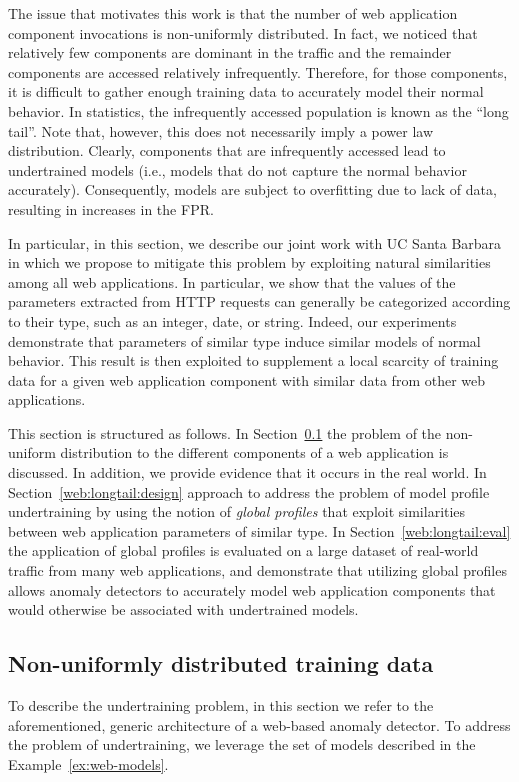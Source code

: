 The issue that motivates this work is that the number of web application component invocations is non-uniformly distributed. In fact, we noticed that relatively few components are dominant in the traffic and the remainder components are accessed relatively infrequently. Therefore, for those components, it is difficult to gather enough training data to accurately model their normal behavior.  In statistics, the infrequently accessed population is known as the ``long tail''. Note that, however, this does not necessarily imply a power law distribution. Clearly, components that are infrequently accessed lead to undertrained models (i.e., models that do not capture the normal behavior accurately). Consequently, models are subject to overfitting due to lack of data, resulting in increases in the \ac{FPR}.

In particular, in this section, we describe our joint work with UC Santa Barbara in which we propose to mitigate this problem by exploiting natural similarities among all web applications. In particular, we show that the values of the parameters extracted from \ac{HTTP} requests can generally be categorized according to their type, such as an integer, date, or string.  Indeed, our experiments demonstrate that parameters of similar type induce similar models of normal behavior.  This result is then exploited to supplement a local scarcity of training data for a given web application component with similar data from other web applications.

This section is structured as follows. In Section~\ref{web:longtail:motivation} the problem of the non-uniform distribution to the different components of a web application is discussed. In addition, we provide evidence that it occurs in the real world. In Section~\ref{web:longtail:design} approach to address the problem of model profile undertraining by using the notion of \emph{global profiles} that exploit similarities between web application parameters of similar type. In Section~\ref{web:longtail:eval} the application of global profiles is evaluated on a large dataset of real-world traffic from many web applications, and demonstrate that utilizing global profiles allows anomaly detectors to accurately model web application components that would otherwise be associated with undertrained models.

\subsection{Non-uniformly distributed training data}
\label{web:longtail:motivation}
To describe the undertraining problem, in this section we refer to the aforementioned, generic architecture of a web-based anomaly detector. To address the problem of undertraining, we leverage the set of models described in the Example~\ref{ex:web-models}.

